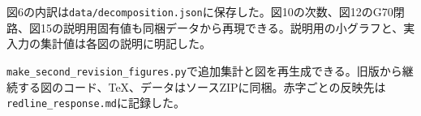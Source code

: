 {\small
図6の内訳は\texttt{data/decomposition.json}に保存した。図10の次数、図12のG70閉路、図15の説明用固有値も同梱データから再現できる。説明用の小グラフと、実入力の集計値は各図の説明に明記した。

\texttt{make\_second\_revision\_figures.py}で追加集計と図を再生成できる。旧版から継続する図のコード、TeX、データはソースZIPに同梱。赤字ごとの反映先は\texttt{redline\_response.md}に記録した。
}

